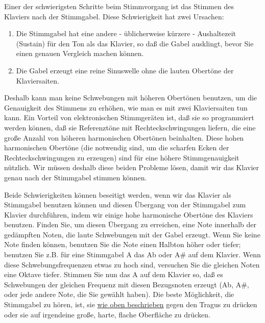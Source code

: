 Einer der schwierigsten Schritte beim Stimmvorgang ist das Stimmen des Klaviers nach der Stimmgabel.
 Diese Schwierigkeit hat zwei Ursachen:
 
\begin{enumerate}
	\item Die Stimmgabel hat eine andere - üblicherweise kürzere - Aushaltezeit (Sustain) für den Ton als das
  Klavier, so daß die Gabel ausklingt, bevor Sie einen genauen Vergleich machen können.
	\item Die Gabel erzeugt eine reine Sinuswelle ohne die lauten Obertöne der Klaviersaiten.
\end{enumerate}

Deshalb kann man keine Schwebungen mit höheren Obertönen benutzen, um die Genauigkeit des Stimmens zu erhöhen, wie man es mit zwei Klaviersaiten tun kann.
 Ein Vorteil von elektronischen Stimmgeräten ist, daß sie so programmiert werden können, daß sie Referenztöne mit Rechteckschwingungen liefern, die eine große Anzahl von höheren harmonischen Obertönen beinhalten.
 Diese hohen harmonischen Obertöne (die notwendig sind, um die scharfen Ecken der Rechteckschwingungen zu erzeugen) sind für eine höhere Stimmgenauigkeit nützlich.
 Wir müssen deshalb diese beiden Probleme lösen, damit wir das Klavier genau nach der Stimmgabel stimmen können.
 

Beide Schwierigkeiten können beseitigt werden, wenn wir das Klavier als Stimmgabel benutzen können und diesen Übergang von der Stimmgabel zum Klavier durchführen, indem wir einige hohe harmonische Obertöne des Klaviers benutzen.
 Finden Sie, um diesen Übergang zu erreichen, eine Note innerhalb der gedämpften Noten, die laute Schwebungen mit der Gabel erzeugt.
 Wenn Sie keine Note finden können, benutzen Sie die Note einen Halbton höher oder tiefer; benutzen Sie z.B. für eine Stimmgabel A das Ab oder A\# auf dem Klavier.
 Wenn diese Schwebungsfrequenzen etwas zu hoch sind, versuchen Sie die gleichen Noten eine Oktave tiefer.
 Stimmen Sie nun das A auf dem Klavier so, daß es Schwebungen der gleichen Frequenz mit diesen Bezugsnoten erzeugt (Ab, A\#, oder jede andere Note, die Sie gewählt haben).
 Die beste Möglichkeit, die Stimmgabel zu hören, ist, sie \hyperlink{c2_3_gabel}{wie oben beschrieben} gegen den Tragus zu drücken oder sie auf irgendeine große, harte, flache Oberfläche zu drücken.
 \hypertarget{c2_6c}{}\hypertarget{c2_6_kirn}{}

